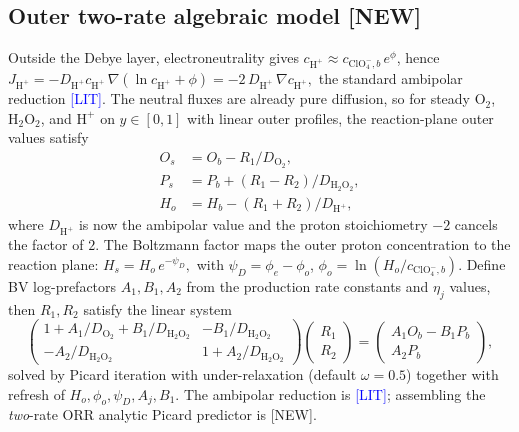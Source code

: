 \documentclass[11pt]{article}
\newcommand{\lit}{\textcolor{blue}{[LIT]}}
\newcommand{\new}{\textcolor{red!70!black}{[NEW]}}
\newcommand{\R}{\mathbb{R}}
\newcommand{\ClO}{\text{ClO}_4^-}
\newcommand{\Hp}{\text{H}^+}
\newcommand{\Otwo}{\text{O}_2}
\newcommand{\Htwo}{\text{H}_2\text{O}_2}
\begin{document}
\subsection{Outer two-rate algebraic model \new}
Outside the Debye layer, electroneutrality gives
$c_{\Hp}\approx c_{\ClO,b}\,e^{\phi}$, hence
\(
  J_{\Hp} = -D_{\Hp} c_{\Hp}\,\nabla(\ln c_{\Hp}+\phi)
          = -2\,D_{\Hp}\,\nabla c_{\Hp},
\)
the standard ambipolar reduction \cite{newman2004} \lit{}.  The
neutral fluxes are already pure diffusion, so for steady $\Otwo$,
$\Htwo$, and $\Hp$ on $y\in[0,1]$ with linear outer profiles, the
reaction-plane outer values satisfy
\begin{align}
  O_s &= O_b - R_1/D_{\Otwo}, \\
  P_s &= P_b + (R_1-R_2)/D_{\Htwo}, \\
  H_o &= H_b - (R_1+R_2)/D_{\Hp},
\end{align}
where $D_{\Hp}$ is now the ambipolar value and the proton stoichiometry
$-2$ cancels the factor of $2$.  The Boltzmann factor maps the outer
proton concentration to the reaction plane:
\(
  H_s = H_o\,e^{-\psi_D},
\)
with $\psi_D = \phi_e-\phi_o$, $\phi_o = \ln(H_o/c_{\ClO,b})$.
Define BV log-prefactors $A_1,B_1,A_2$ from the production rate
constants and $\eta_j$ values, then $R_1, R_2$ satisfy the linear
system
\begin{equation}
  \begin{pmatrix}
    1+A_1/D_{\Otwo}+B_1/D_{\Htwo} & -B_1/D_{\Htwo}\\[2pt]
    -A_2/D_{\Htwo} & 1+A_2/D_{\Htwo}
  \end{pmatrix}\!
  \begin{pmatrix}R_1\\R_2\end{pmatrix}
  = \begin{pmatrix}A_1 O_b - B_1 P_b\\ A_2 P_b\end{pmatrix},
\end{equation}
solved by Picard iteration with under-relaxation (default $\omega=0.5$)
together with refresh of $H_o, \phi_o, \psi_D, A_j, B_1$.
The ambipolar reduction is \lit{}; assembling the
\emph{two}-rate ORR analytic Picard predictor is \new{}.
\end{document}
